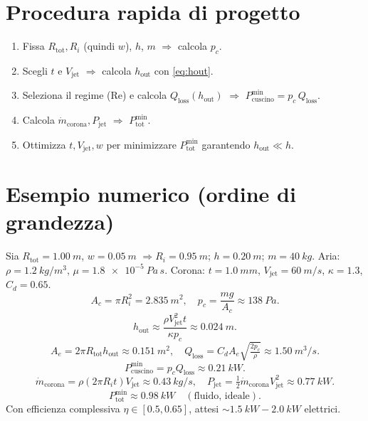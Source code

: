 \documentclass[11pt,a4paper]{article}
\begin{document}
\section{Procedura rapida di progetto}
\begin{enumerate}
  \item Fissa \(R_{\mathrm{tot}}, R_i\) (quindi \(w\)), \(h\), \(m\) \(\Rightarrow\) calcola \(p_c\).
  \item Scegli \(t\) e \(V_{\mathrm{jet}}\) \(\Rightarrow\) calcola \(h_{\mathrm{out}}\) con \eqref{eq:hout}.
  \item Seleziona il regime (Re) e calcola \(Q_{\mathrm{loss}}(h_{\mathrm{out}})\) \(\Rightarrow\)
        \(P_{\mathrm{cuscino}}^{\min}=p_c\,Q_{\mathrm{loss}}\).
  \item Calcola \(\dot{m}_{\mathrm{corona}}, P_{\mathrm{jet}}\) \(\Rightarrow\) \(P_{\mathrm{tot}}^{\min}\).
  \item Ottimizza \(t, V_{\mathrm{jet}}, w\) per minimizzare \(P_{\mathrm{tot}}^{\min}\) garantendo \(h_{\mathrm{out}}\ll h\).
\end{enumerate}

\section{Esempio numerico (ordine di grandezza)}
Sia \(R_{\mathrm{tot}}=\SI{1.00}{m}\), \(w=\SI{0.05}{m}\) \(\Rightarrow R_i=\SI{0.95}{m}\); \(h=\SI{0.20}{m}\); \(m=\SI{40}{kg}\).
Aria: \(\rho=\SI{1.2}{kg/m^3}\), \(\mu=\SI{1.8e-5}{Pa\,s}\).
Corona: \(t=\SI{1.0}{mm}\), \(V_{\mathrm{jet}}=\SI{60}{m/s}\), \(\kappa=1.3\), \(C_d=0.65\).
\[
A_c=\pi R_i^2=\SI{2.835}{m^2},\quad
p_c=\frac{mg}{A_c}\approx \SI{138}{Pa}.
\]
\[
h_{\mathrm{out}}\approx\frac{\rho V_{\mathrm{jet}}^2 t}{\kappa p_c}
\approx \SI{0.024}{m}.
\]
\[
A_e=2\pi R_{\mathrm{tot}} h_{\mathrm{out}}\approx \SI{0.151}{m^2},\quad
Q_{\mathrm{loss}}=C_d A_e\sqrt{\tfrac{2p_c}{\rho}}\approx \SI{1.50}{m^3/s}.
\]
\[
P_{\mathrm{cuscino}}^{\min}=p_c Q_{\mathrm{loss}}\approx \SI{0.21}{kW}.
\]
\[
\dot{m}_{\mathrm{corona}}=\rho (2\pi R_i t) V_{\mathrm{jet}}\approx \SI{0.43}{kg/s},\quad
P_{\mathrm{jet}}=\tfrac12 \dot{m}_{\mathrm{corona}} V_{\mathrm{jet}}^2\approx \SI{0.77}{kW}.
\]
\[
P_{\mathrm{tot}}^{\min}\approx \SI{0.98}{kW}\quad(\text{fluido, ideale}).
\]
Con efficienza complessiva \(\eta\in[0.5,0.65]\), attesi \(\sim \SI{1.5}{kW} - \SI{2.0}{kW}\) elettrici.
\end{document}
